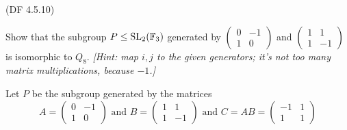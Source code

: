 \begin{problem}{(\textsf{DF 4.5.10})}
\begin{enumalph}
    \item Show that the subgroup $P \leq \operatorname{SL}_2(\mathbb{F}_3)$ generated by
      $\begin{pmatrix} 0 & -1 \\ 1 & 0 \end{pmatrix}$
      and $\begin{pmatrix} 1 & 1 \\ 1 & -1 \end{pmatrix}$
      is isomorphic to $Q_8$.
      \emph{[Hint: map $i,j$ to the given generators; it's not too 
      many matrix multiplications, because $-1$.]}

      \begin{Answer}
        Let $P$ be the subgroup generated by the matrices
        \[ A = \begin{pmatrix} 0 & -1 \\ 1 & 0 \end{pmatrix} \text{ and }
          B = \begin{pmatrix} 1 & 1 \\ 1 & -1 \end{pmatrix} \text{ and }
          C = AB = \begin{pmatrix} -1 & 1 \\ 1 & 1 \end{pmatrix} \]
        

\end{Answer}
\end{enumalph}
\end{problem}
